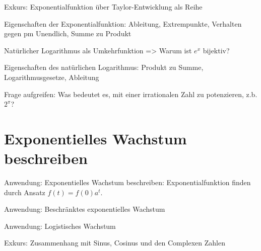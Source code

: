Exkurs: Exponentialfunktion über Taylor-Entwicklung als Reihe 

\begin{definition}
    
\end{definition}

Eigenschaften der Exponentialfunktion: Ableitung, Extrempunkte, Verhalten gegen pm Unendlich, Summe zu Produkt

\begin{theorem}
    
\end{theorem}

\begin{corollary}
    
\end{corollary}

\begin{theorem}
    
\end{theorem}

Natürlicher Logarithmus als Umkehrfunktion => Warum ist \(e^x\) bijektiv?

\begin{definition}
    
\end{definition}

Eigenschaften des natürlichen Logarithmus: Produkt zu Summe, Logarithmusgesetze, Ableitung

\begin{theorem}
    
\end{theorem}

Frage aufgreifen: Was bedeutet es, mit einer irrationalen Zahl zu potenzieren, z.b. \(2^\pi\)?

\begin{definition}
    
\end{definition}

\section{Exponentielles Wachstum beschreiben}

Anwendung: Exponentielles Wachstum beschreiben: Exponentialfunktion finden durch Ansatz \(f(t) = f(0)a^t\). 

Anwendung: Beschränktes exponentielles Wachstum 

Anwendung: Logistisches Wachstum

Exkurs: Zusammenhang mit Sinus, Cosinus und den Complexen Zahlen

